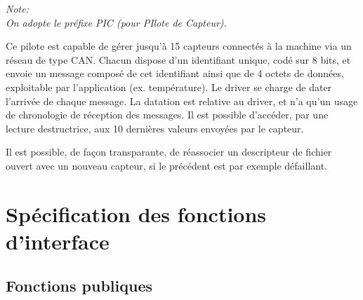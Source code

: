 
\textsl{
Note:\\
On adopte le préfixe PIC (pour PIlote de Capteur).
}

Ce pilote est capable de gérer jusqu'à 15 capteurs connectés à la 
machine via un réseau de type CAN. Chacun dispose d'un identifiant
unique, codé sur 8 bits, et envoie un message composé de cet
identifiant ainsi que de 4 octets de données, exploitable par
l'application (ex. température).
Le driver se charge de dater l'arrivée de chaque message.
La datation est relative au driver, et n'a qu'un usage
de chronologie de réception des messages.
Il est possible d'accéder, par une lecture destructrice, aux
10 dernières valeurs envoyées par le capteur.

Il est possible, de façon transparante, de réassocier un descripteur
de fichier ouvert avec un nouveau capteur, si le précédent est 
par exemple défaillant.
\section{Spécification des fonctions d'interface}

\subsection{Fonctions publiques}

